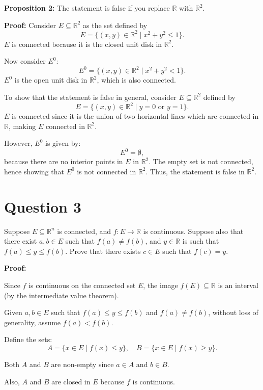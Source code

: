 \documentclass{article}
\begin{document}
\textbf{Proposition 2:} The statement is false if you replace \( \mathbb{R} \) with \( \mathbb{R}^2 \).

\textbf{Proof:} Consider \( E \subseteq \mathbb{R}^2 \) as the set defined by
\[
E = \{(x, y) \in \mathbb{R}^2 \mid x^2 + y^2 \leq 1\}.
\]
\( E \) is connected because it is the closed unit disk in \( \mathbb{R}^2 \).

Now consider \( E^0 \):
\[
E^0 = \{(x, y) \in \mathbb{R}^2 \mid x^2 + y^2 < 1\}.
\]
\( E^0 \) is the open unit disk in \( \mathbb{R}^2 \), which is also connected.

To show that the statement is false in general, consider \( E \subseteq \mathbb{R}^2 \) defined by
\[
E = \{(x, y) \in \mathbb{R}^2 \mid y = 0 \text{ or } y = 1\}.
\]
\( E \) is connected since it is the union of two horizontal lines which are connected in \( \mathbb{R} \), making \( E \) connected in \( \mathbb{R}^2 \).

However, \( E^0 \) is given by:
\[
E^0 = \emptyset,
\]
because there are no interior points in \( E \) in \( \mathbb{R}^2 \). The empty set is not connected, hence showing that \( E^0 \) is not connected in \( \mathbb{R}^2 \). Thus, the statement is false in \( \mathbb{R}^2 \).


\section{Question 3}
 Suppose \( E \subseteq \mathbb{R}^n \) is connected, and \( f : E \to \mathbb{R} \) is continuous.
Suppose also that there exist \( a, b \in E \) such that \( f(a) \neq f(b) \), and \( y \in \mathbb{R} \) is
such that \( f(a) \leq y \leq f(b) \). Prove that there exists \( c \in E \) such that \( f(c) = y \).

\textbf{Proof:} 

Since \( f \) is continuous on the connected set \( E \), the image \( f(E) \subseteq \mathbb{R} \) is an interval (by the intermediate value theorem).

Given \( a, b \in E \) such that \( f(a) \leq y \leq f(b) \) and \( f(a) \neq f(b) \), without loss of generality, assume \( f(a) < f(b) \).

Define the sets:
\[
A = \{x \in E \mid f(x) \leq y\}, \quad B = \{x \in E \mid f(x) \geq y\}.
\]

Both \( A \) and \( B \) are non-empty since \( a \in A \) and \( b \in B \).

Also, \( A \) and \( B \) are closed in \( E \) because \( f \) is continuous.
\end{document}

